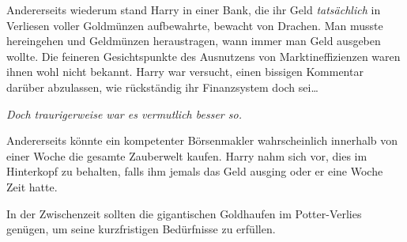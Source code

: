 Andererseits wiederum stand Harry in einer Bank, die ihr Geld \emph{tatsächlich} in Verliesen voller Goldmünzen aufbewahrte, bewacht von Drachen. Man musste hereingehen und Geldmünzen heraustragen, wann immer man Geld ausgeben wollte. Die feineren Gesichtspunkte des Ausnutzens von Marktineffizienzen waren ihnen wohl nicht bekannt. Harry war versucht, einen bissigen Kommentar darüber abzulassen, wie rückständig ihr Finanzsystem doch sei…

\emph{Doch traurigerweise war es vermutlich besser so.}

Andererseits könnte ein kompetenter Börsenmakler wahrscheinlich innerhalb von einer Woche die gesamte Zauberwelt kaufen. Harry nahm sich vor, dies im Hinterkopf zu behalten, falls ihm jemals das Geld ausging oder er eine Woche Zeit hatte.

In der Zwischenzeit sollten die gigantischen Goldhaufen im Potter-Verlies genügen, um seine kurzfristigen Bedürfnisse zu erfüllen.

